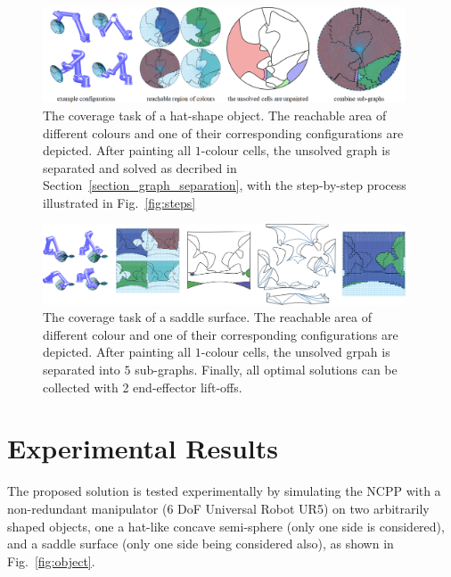 \documentclass[journal]{IEEEtran}
\begin{document}
\begin{figure}[t]
\centering
\includegraphics[width=0.96\textwidth]{figures/hat_exp/fig_hat_2}
\caption{The coverage task of a hat-shape object. The reachable area of different colours and one of their corresponding configurations are depicted. After painting all $1$-colour cells, the unsolved graph is %
separated and solved as decribed in Section~\ref{section_graph_separation}, with the step-by-step process illustrated in Fig.~\ref{fig:steps} } %
\label{fig:hat}
\end{figure}
\begin{figure}[t]
\centering
\includegraphics[width=0.96\textwidth]{figures/saddle_exp/comb}
\caption{The coverage task of a saddle surface. The reachable area of different colour and one of their corresponding configurations are depicted. After painting all $1$-colour cells, the unsolved grpah is separated into $5$ sub-graphs. Finally, all optimal solutions can be collected with 2 end-effector lift-offs.}
\label{fig:saddle}
\end{figure}

\section{Experimental Results}\label{section_experiment}
\label{section_results}

The proposed solution is tested experimentally by simulating the NCPP with a non-redundant manipulator (6 DoF Universal Robot UR5) on two arbitrarily shaped objects, one a hat-like concave semi-sphere (only one side is considered), and a saddle surface (only one side being considered also), as shown in Fig.~\ref{fig:object}.
\end{document}
